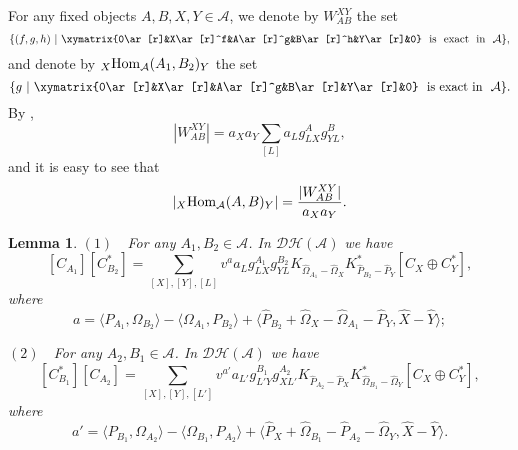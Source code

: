 \documentclass[reqno,12pt]{amsart}
\numberwithin{equation}{section}
\def\lr#1{\langle #1\rangle} \def\fin{\hfill$\square$}  \def\lra{\longrightarrow} \def\Tor{\mbox{\rm Tor}\,}
\def\A{{\mathcal A}}\def\P{{\mathscr{P}}}
\theoremstyle{plain} %
\newtheorem{lemma}[theorem]{\bf Lemma}
\theoremstyle{definition} %
\begin{document}
For any fixed objects $A,B,X,Y\in\A$, we denote by $W_{AB}^{XY}$ the set
$$\{(f,g,h)~|~\xymatrix{0\ar[r]&X\ar[r]^f&A\ar[r]^g&B\ar[r]^h&Y\ar[r]&0}~~\mbox{is~~exact~~in}~~\A\},$$
and denote by ${}_X\Hom_{\A}(A_1,B_2)_Y$ the set $$\{g~|~\xymatrix{0\ar[r]&X\ar[r]&A\ar[r]^g&B\ar[r]&Y\ar[r]&0}~~\mbox{is exact in}~~\A\}.$$
By \cite[(8.8)]{Vanden},  $$|W_{AB}^{XY}|=a_Xa_Y\sum\limits_{[L]}a_Lg_{LX}^Ag_{YL}^B,$$
and it is easy to see that \begin{equation}\label{lHoml}|{}_X\Hom_{\A}(A,B)_Y|=\frac{|W_{AB}^{XY}|}{a_Xa_Y}.\end{equation}


\begin{lemma}\label{mainlemma}
$(1)$~~For any $A_1,B_2\in\A$. In $\mathcal {D}\mathcal {H}(\mathcal{A})$ we have
$$[C_{A_1}][C_{B_2}^\ast]=\sum_{[X],[Y],[L]}v^{a}a_Lg_{LX}^{A_1}g_{YL}^{B_2}K_{\hat{\Omega}_{A_1}-\hat{\Omega}_X}K_{\hat{P}_{B_2}-\hat{P}_Y}^\ast[C_X\oplus C_Y^\ast],$$
where $$a=\lr{P_{A_1},\Omega_{B_2}}-\lr{\Omega_{A_1},P_{B_2}}+\lr{\hat{P}_{B_2}+\hat{\Omega}_X-\hat{\Omega}_{A_1}-\hat{P}_Y,\hat{X}-\hat{Y}};$$

$(2)$~~For any $A_2,B_1\in\A$. In $\mathcal {D}\mathcal {H}(\mathcal{A})$ we have
$$[C_{B_1}^\ast][C_{A_2}]=\sum_{[X],[Y],[L']}v^{a'}a_{L'}g_{L'Y}^{B_1}g_{XL'}^{A_2}K_{\hat{P}_{{A}_2}-\hat{P}_X}K_{\hat{\Omega}_{B_1}-\hat{\Omega}_Y}^\ast[C_X\oplus C_Y^\ast],$$
where $$a'=\lr{P_{B_1},\Omega_{A_2}}-\lr{\Omega_{B_1},P_{A_2}}+\lr{\hat{P}_X+\hat{\Omega}_{B_1}-\hat{P}_{A_2}-\hat{\Omega}_{Y},\hat{X}-\hat{Y}}.$$
\end{lemma}
\end{document}
